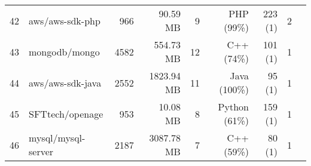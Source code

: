 \begin{table*}[b]
\begin{tabular}{llrr rrr rr}
42 & aws/aws-sdk-php & 966 & 90.59 MB & 9 & PHP (99\%) &223  (1) & 2 \\
43 & mongodb/mongo & 4582 & 554.73 MB & 12 & C++ (74\%)  &101  (1) & 1 \\
44 & aws/aws-sdk-java & 2552 & 1823.94 MB & 11 & Java (100\%)  &95  (1) & 1 \\
45 & SFTtech/openage & 953 & 10.08 MB & 8 & Python (61\%)  &159  (1) & 1 \\
46 & mysql/mysql-server & 2187 & 3087.78 MB & 7 & C++ (59\%)  &80  (1) & 1 \\
        \bottomrule
    \end{tabular}
    \label{tab:all_repos}
\end{table*}